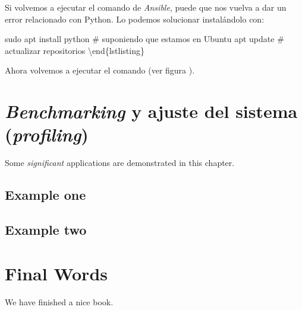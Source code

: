 \documentclass[
]{memoir}
\begin{document}
Si volvemos a ejecutar el comando de \emph{Ansible}, puede que nos vuelva a dar un error relacionado con Python. Lo podemos solucionar instalándolo con:

sudo apt install python \# suponiendo que estamos en Ubuntu
apt update \# actualizar repositorios
\textbackslash end\{lstlisting\}

Ahora volvemos a ejecutar el comando (ver figura ).

\hypertarget{benchmarking-y-ajuste-del-sistema-profiling}{%
\chapter{\texorpdfstring{\emph{Benchmarking} y ajuste del sistema (\emph{profiling})}{Benchmarking y ajuste del sistema (profiling)}}\label{benchmarking-y-ajuste-del-sistema-profiling}}

Some \emph{significant} applications are demonstrated in this chapter.

\hypertarget{example-one}{%
\section{Example one}\label{example-one}}

\hypertarget{example-two}{%
\section{Example two}\label{example-two}}

\hypertarget{final-words}{%
\chapter{Final Words}\label{final-words}}

We have finished a nice book.

  
\end{document}

